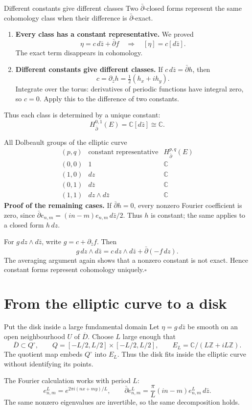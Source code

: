 \documentclass[aspectratio=169,11pt]{beamer}
\newcommand{\db}{\bar\partial}
\newcommand{\C}{\mathbb C}
\newcommand{\Z}{\mathbb Z}
\newcommand{\ee}{e_{n,m}}
\newcommand{\pbarz}{\partial_{\bar z}}
\begin{document}
\begin{frame}{Different constants give different classes}
Two $\db$-closed forms represent the same cohomology class when their
difference is $\db$-exact.

\begin{enumerate}
\item \textbf{Every class has a constant representative.}
We proved
\[
 \eta=c\,d\bar z+\db f
 \quad\Longrightarrow\quad [\eta]=c[d\bar z].
\]
The exact term disappears in cohomology.

\item \textbf{Different constants give different classes.}
If $c\,d\bar z=\db h$, then
\[
 c=\pbarz h=\tfrac12(h_x+i h_y).
\]
Integrate over the torus: derivatives of periodic functions have
integral zero, so $c=0$. Apply this to the difference of two constants.
\end{enumerate}

Thus each class is determined by a unique constant:
\[
 H^{0,1}_{\db}(E)=\C[d\bar z]\cong\C.
\]
\end{frame}

\begin{frame}{All Dolbeault groups of the elliptic curve}
\[
\begin{array}{c|c|c}
 (p,q)&\text{constant representative}&H^{p,q}_{\db}(E)\\\hline
 (0,0)&1&\C\\
 (1,0)&dz&\C\\
 (0,1)&d\bar z&\C\\
 (1,1)&dz\wedge d\bar z&\C
\end{array}
\]
\textbf{Proof of the remaining cases.}
If $\db h=0$, every nonzero Fourier coefficient is zero, since
$\db\ee=(in-m)\ee\,d\bar z/2$. Thus $h$ is constant;
the same applies to a closed form $h\,dz$.

For $g\,dz\wedge d\bar z$, write $g=c+\pbarz f$. Then
\[
 g\,dz\wedge d\bar z
 =c\,dz\wedge d\bar z+\db(-f\,dz).
\]
The averaging argument again shows that a nonzero constant is not exact.
Hence constant forms represent cohomology uniquely.\hfill$\square$
\end{frame}

\section{From the elliptic curve to a disk}
\begin{frame}{Put the disk inside a large fundamental domain}
Let $\eta=g\,d\bar z$ be smooth on an open neighbourhood $U$ of
$\overline D$. Choose $L$ large enough that
\[
 \overline D\subset Q^\circ,\qquad
 Q=[-L/2,L/2]\times[-L/2,L/2],\qquad
 E_L=\C/(L\Z+iL\Z).
\]
The quotient map embeds $Q^\circ$ into $E_L$.
Thus the disk fits inside the elliptic curve without identifying its points.

The Fourier calculation works with period $L$:
\[
 e^L_{n,m}=e^{2\pi i(nx+my)/L},\qquad
 \db e^L_{n,m}=\frac{\pi}{L}(in-m)e^L_{n,m}\,d\bar z.
\]
The same nonzero eigenvalues are invertible, so the same decomposition holds.
\end{frame}
\end{document}
